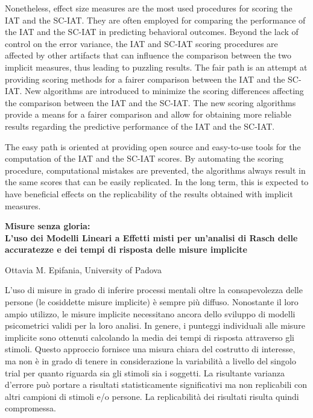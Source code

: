 \documentclass[12pt, a4paper, titilepage]{article}
\begin{document}
	Nonetheless, effect size measures are the most used procedures for scoring the IAT and the SC-IAT. They are often employed for comparing the performance of the IAT and the SC-IAT in predicting behavioral outcomes. Beyond the lack of control on the error variance, the IAT and SC-IAT scoring procedures are affected by other artifacts that can influence the comparison between the two implicit measures, thus leading to puzzling results. The fair path is an attempt at providing scoring methods for a fairer comparison between the IAT and the SC-IAT. New algorithms are introduced to minimize the scoring differences affecting the comparison between the IAT and the SC-IAT. The new scoring algorithms provide a means for a fairer comparison and allow for obtaining more reliable results regarding the predictive performance of the IAT and the SC-IAT.
	
	The easy path is oriented at providing open source and easy-to-use tools for the computation of the IAT and the SC-IAT scores. By automating the scoring procedure, computational mistakes are prevented, the algorithms always result in the same scores that can be easily replicated. In the long term, this is expected to have beneficial effects on the replicability of the results obtained with implicit measures. 
	

\newpage

\begin{center}
	\begin{large}
		\textbf{Misure senza gloria: \\ L’uso dei Modelli Lineari a Effetti misti per un’analisi di Rasch delle accuratezze e dei tempi di risposta delle misure implicite}
	\end{large}
	
	\vspace{5mm}
	Ottavia M. Epifania, University of Padova
\end{center}

L’uso di misure in grado di inferire processi mentali oltre la consapevolezza delle persone (le cosiddette misure implicite) è sempre più diffuso. Nonostante il loro ampio utilizzo, le misure implicite necessitano ancora dello sviluppo di modelli psicometrici validi per la loro analisi. In genere, i punteggi individuali alle misure implicite sono ottenuti calcolando la media dei tempi di risposta attraverso gli stimoli. Questo approccio fornisce una misura chiara del costrutto di interesse, ma non è in grado di tenere in considerazione la variabilità a livello del singolo trial per quanto riguarda sia gli stimoli sia i soggetti. La risultante varianza d’errore può portare a risultati statisticamente significativi ma non replicabili con altri campioni di stimoli e/o persone. La replicabilità dei risultati risulta quindi compromessa. 
\end{document}
